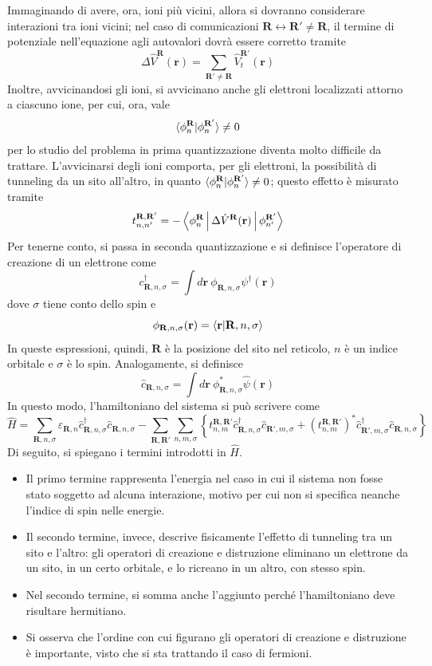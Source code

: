 \documentclass[11pt, a4paper]{scrartcl}
\theoremstyle{style}
\theoremstyle{style1}
\numberwithin{equation}{subsection}
\begin{document}
Immaginando di avere, ora, ioni pi\`u vicini, allora si dovranno considerare interazioni tra ioni vicini; nel caso di comunicazioni $\mathbf{R} \longleftrightarrow \mathbf{R} ' \neq \mathbf{R} $, il termine di potenziale nell'equazione agli autovalori dovr\`a essere corretto tramite
\[
\Delta \hat{V}^\mathbf{R} (\mathbf{r} ) = \sum_{\mathbf{R} ' \neq \mathbf{R} }^{}\hat{V}_t ^{\mathbf{R} '} (\mathbf{r} )
\] 
Inoltre, avvicinandosi gli ioni, si avvicinano anche gli elettroni localizzati attorno a ciascuno ione, per cui, ora, vale
\[
\braket{\phi _n^\mathbf{R} |\phi _n^{\mathbf{R} '} } \neq 0
\] 
per lo studio del problema in prima quantizzazione diventa molto difficile da trattare.
L'avvicinarsi degli ioni comporta, per gli elettroni, la possibilit\`a di tunneling da un sito all'altro, in quanto $ \braket{\phi _n^{\mathbf{R} }|\phi _n ^{\mathbf{R} '}}\neq 0$; questo effetto \`e misurato tramite  
\[
t _{n,n'} ^{\mathbf{R} ,\mathbf{R} '}  = - \Braket{\phi _n^\mathbf{R} |\Delta \hat{V}^\mathbf{R} (\mathbf{r} )|\phi _{n'} ^{\mathbf{R'}} } 
\] 
Per tenerne conto, si passa in seconda quantizzazione e si definisce l'operatore di creazione di un elettrone come
\begin{equation}
c^\dagger _{\mathbf{R} ,n, \sigma }  = \int d\mathbf{r} \ \phi _{\mathbf{R} ,n , \sigma } \psi ^\dagger (\mathbf{r} )
\end{equation}
dove $\sigma $ tiene conto dello spin e 
\[
\phi _{\mathbf{R} ,n,\sigma } (\mathbf{r} ) = \braket{\mathbf{r} |\mathbf{R} ,n,\sigma } 
\] 
In queste espressioni, quindi, $\mathbf{R} $ \`e la posizione del sito nel reticolo, $n$ \`e un indice orbitale e $\sigma $ \`e lo spin.
Analogamente, si definisce 
\[
\hat{c}_{\mathbf{R} ,n , \sigma } = \int d\mathbf{r}  \ \phi ^*_{\mathbf{R} ,n,\sigma } \hat{\psi }(\mathbf{r} )
\] 
In questo modo, l'hamiltoniano del sistema si pu\`o scrivere come
\[
\hat{H} = \sum_{\mathbf{R} ,n , \sigma }^{} \varepsilon _{\mathbf{R} , n }  \hat{c}^\dagger _{\mathbf{R} ,n,\sigma }  \hat{c}_{\mathbf{R} ,n,\sigma }  - \sum_{\mathbf{R} ,\mathbf{R} '}^{} \sum_{n,m,\sigma }^{} \left\{ t_{n,m} ^{\mathbf{R} ,\mathbf{R} '} \hat{c}^\dagger _{\mathbf{R} ,n,\sigma } \hat{c}_{\mathbf{R} ' , m ,\sigma } + \left(t_{n,m} ^{\mathbf{R} ,\mathbf{R} '} \right)^* \hat{c}^\dagger _{\mathbf{R} ',m,\sigma } \hat{c}_{\mathbf{R} ,n,\sigma }   \right\} 
\] 
Di seguito, si spiegano i termini introdotti in $\hat{H}$.
\begin{itemize}
	\item Il primo termine rappresenta l'energia nel caso in cui il sistema non fosse stato soggetto ad alcuna interazione, motivo per cui non si specifica neanche l'indice di spin nelle energie.
	\item Il secondo termine, invece, descrive fisicamente l'effetto di tunneling tra un sito e l'altro: gli operatori di creazione e distruzione eliminano un elettrone da un sito, in un certo orbitale, e lo ricreano in un altro, con stesso spin.
	\item Nel secondo termine, si somma anche l'aggiunto perch\'e l'hamiltoniano deve risultare hermitiano.
	\item Si osserva che l'ordine con cui figurano gli operatori di creazione e distruzione \`e importante, visto che si sta trattando il caso di fermioni.
\end{itemize}
\end{document}
